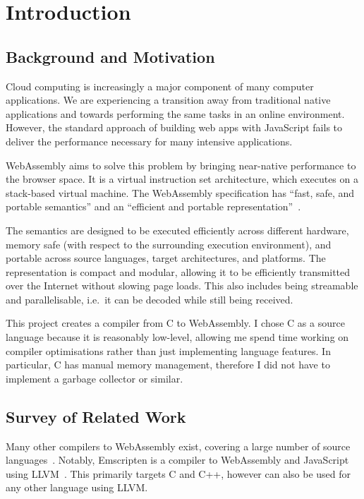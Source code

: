 \documentclass[00-main.tex]{subfiles}
\begin{document}
\chapter{Introduction}

\section{Background and Motivation}

Cloud computing is increasingly a major component of many computer applications.
We are experiencing a transition away from traditional native applications and towards performing the same tasks in an online environment.
However, the standard approach of building web apps with JavaScript fails to deliver the performance necessary for many intensive applications.

WebAssembly aims to solve this problem by bringing near-native performance to the browser space.
It is a virtual instruction set architecture, which executes on a stack-based virtual machine.
The WebAssembly specification has ``fast, safe, and portable semantics'' and an ``efficient and portable representation''~.

The semantics are designed to be executed efficiently across different hardware, memory safe (with respect to the surrounding execution environment), and portable across source languages, target architectures, and platforms.
The representation is compact and modular, allowing it to be efficiently transmitted over the Internet without slowing page loads.
This also includes being streamable and parallelisable, i.e.~it can be decoded while still being received.

This project creates a compiler from C to WebAssembly.
I chose C as a source language because it is reasonably low-level, allowing me spend time working on compiler optimisations rather than just implementing language features.
In particular, C has manual memory management, therefore I did not have to implement a garbage collector or similar.


\section{Survey of Related Work}

Many other compilers to WebAssembly exist, covering a large number of source languages~.
Notably, Emscripten is a compiler to WebAssembly and JavaScript using LLVM~.
This primarily targets C and C++, however can also be used for any other language using LLVM\@.
\end{document}
